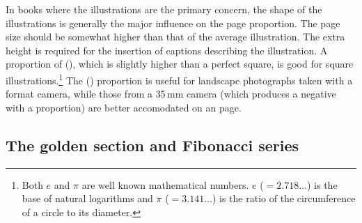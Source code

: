 \documentclass[10pt,a4paper,oneside,extrafontsizes]{memoir}%
\newcommand\U[2]{\textrm{#1}\,\textrm{#2}}
\begin{document}
\begin{paracol}{2}
\switchEng
    In books where the illustrations are the primary 
concern, the shape of the illustrations is generally 
the major influence on the page proportion.
The page size should be somewhat higher than that of the average 
illustration. The extra height is required for the 
insertion of captions describing the
illustration. 
A proportion of  (), 
which is slightly higher
than a perfect square, is good for square illustrations.\footnote{Both $e$
and $\pi$ are well known mathematical numbers. $e$ ($= 2.718 \ldots$)
is the base of natural logarithms and $\pi$ ($= 3.141 \ldots$) is the
ratio of the circumference of a circle to its diameter.}
The 
() proportion is useful for landscape 
photographs  taken with a 
format camera, while those from a \U{35}{mm} camera (which produces a negative
with a  proportion) are better accomodated on 
an  page.
\end{paracol}

\subsection{The golden section and Fibonacci series}
\end{document}
